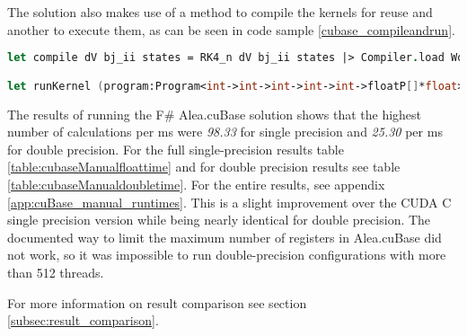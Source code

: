 The solution also makes use of a method to compile the kernels for reuse and another to execute them, as can be seen in code sample \ref{cubase_compileandrun}. 

\begin{lstlisting}[language=FSharp, caption=Kernel compilation and execution methods in F\# Alea.cuBase, label=cubase_compileandrun]
let compile dV bj_ii states = RK4_n dV bj_ii states |> Compiler.load Worker.Default

let runKernel (program:Program<int->int->int->int->int->floatP[]*float>) a b blocks threads = program.Run a b steps blocks threads
\end{lstlisting}

The results of running the F\# Alea.cuBase solution shows that the highest number of calculations per ms were \emph{98.33} for single precision and \emph{25.30} per ms for double precision.
For the full single-precision results table \ref{table:cubaseManualfloattime} and for double precision results see table \ref{table:cubaseManualdoubletime}.
For the entire results, see appendix \ref{app:cuBase_manual_runtimes}.
This is a slight improvement over the CUDA C single precision version while being nearly identical for double precision.
The documented way to limit the maximum number of registers in Alea.cuBase did not work, so it was impossible to run double-precision configurations with more than 512 threads.

For more information on result comparison see section \ref{subsec:result_comparison}.

\begin{table}[h!]
\centering
{}
\caption{F\# Alea.cuBase calculations per ms with single precision\label{table:cubaseManualfloattime}}
\end{table}

